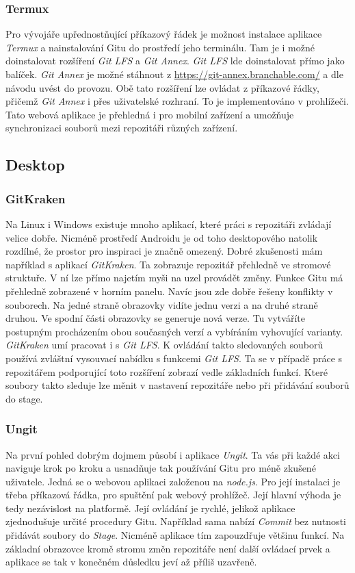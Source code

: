    \subsubsection{Termux}
    Pro vývojáře upřednostňující příkazový řádek je možnost instalace aplikace \emph{Termux} a nainstalování Gitu do prostředí jeho terminálu. Tam je i možné doinstalovat rozšíření \emph{Git LFS} a \emph{Git Annex}. \emph{Git LFS} lde doinstalovat přímo jako balíček. \emph{Git Annex} je možné stáhnout z \url{https://git-annex.branchable.com/} a dle návodu uvést do provozu. Obě tato rozšíření lze ovládat z příkazové řádky, přičemž \emph{Git Annex} i přes uživatelské rozhraní. To je implementováno v prohlížeči. Tato webová aplikace je přehledná i pro mobilní zařízení a umožňuje synchronizaci souborů mezi repozitáři různých zařízení.

    \subsection {Desktop}
    \subsubsection{GitKraken}
    Na Linux i Windows existuje mnoho aplikací, které práci s repozitáři zvládají velice dobře. Nicméně prostředí Androidu je od toho desktopového natolik rozdílné, že prostor pro inspiraci je značně omezený. Dobré zkušenosti mám například s aplikací \emph{GitKraken}. Ta zobrazuje repozitář přehledně ve stromové struktuře. V ní lze přímo najetím myši na uzel provádět změny. Funkce Gitu má přehledně zobrazené v horním panelu. Navíc jsou zde dobře řešeny konflikty v souborech. Na jedné straně obrazovky vidíte jednu verzi a na druhé straně druhou. Ve spodní části obrazovky se generuje nová verze. Tu vytváříte postupným procházením obou současných verzí a vybíráním vyhovující varianty. \emph{GitKraken} umí pracovat i s \emph{Git LFS}. K ovládání takto sledovaných souborů používá zvláštní vysouvací nabídku s funkcemi \emph{Git LFS}. Ta se v případě práce s repozitářem podporující toto rozšíření zobrazí vedle základních funkcí. Které soubory takto sleduje lze měnit v nastavení repozitáře nebo při přidávání souborů do stage.

    \subsubsection{Ungit}
    Na první pohled dobrým dojmem působí i aplikace \emph{Ungit}. Ta vás při každé akci naviguje krok po kroku a usnadňuje tak používání Gitu pro méně zkušené uživatele. Jedná se o webovou aplikaci založenou na \emph{node.js}. Pro její instalaci je třeba příkazová řádka, pro spuštění pak webový prohlížeč. Její hlavní výhoda je tedy nezávislost na platformě. Její ovládání je rychlé, jelikož aplikace zjednodušuje určité procedury Gitu. Například sama nabízí \emph{Commit} bez nutnosti přidávát soubory do \emph{Stage}. Nicméně aplikace tím zapouzdřuje většinu funkcí. Na základní obrazovce kromě stromu změn repozitáře není další ovládací prvek a aplikace se tak v konečném důsledku jeví až příliš uzavřeně.

